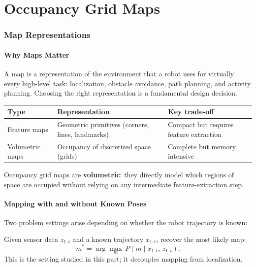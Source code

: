 \documentclass[11pt,a4paper]{article}
\theoremstyle{definition}
\theoremstyle{plain}
\theoremstyle{remark}
\begin{document}
\part{Occupancy Grid Maps}

\section{Map Representations}

\subsection{Why Maps Matter}

A map is a representation of the environment that a robot uses for virtually every high-level task: localization, obstacle avoidance, path planning, and activity planning. Choosing the right representation is a fundamental design decision.

\begin{center}
\begin{tabular}{lll}
\hline
\textbf{Type} & \textbf{Representation} & \textbf{Key trade-off} \\
\hline
Feature maps & Geometric primitives (corners, lines, landmarks) & Compact but requires feature extraction \\
Volumetric maps & Occupancy of discretized space (grids) & Complete but memory intensive \\
\hline
\end{tabular}
\end{center}

Occupancy grid maps are \textbf{volumetric}: they directly model which regions of space are occupied without relying on any intermediate feature-extraction step.

\subsection{Mapping with and without Known Poses}

Two problem settings arise depending on whether the robot trajectory is known:

\begin{tcolorbox}[colback=blue!5!white,colframe=blue!75!black,title=\textbf{Mapping with Known Poses}]
Given sensor data $z_{1:t}$ and a known trajectory $x_{1:t}$, recover the most likely map:
\[
    m^* = \arg\max_{m}\, P(m \mid x_{1:t},\, z_{1:t}).
\]
This is the setting studied in this part; it decouples mapping from localization.
\end{tcolorbox}
\end{document}
